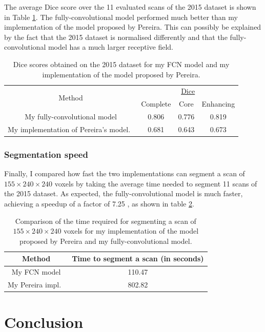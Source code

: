 \documentclass[12pt,a4paper,twoside,openright]{report}
\begin{document}
The average Dice score over the 11 evaluated scans of the 2015 dataset is shown in Table \ref{table:2015_dice}. The fully-convolutional model performed much better than my implementation of the model proposed by Pereira. This can possibly be explained by the fact that the 2015 dataset is normalised differently and that the fully-convolutional model has a much larger receptive field.
\begin{table}
\centering	
\begin{tabular}{c | c c c }
\multirow{2}{*}{Method} & \multicolumn{3}{c}{\underline{Dice}} \\
 & Complete & Core & Enhancing \\
 \hline
 My fully-convolutional model & 0.806 & 0.776 & 0.819\\
 My implementation of Pereira's model.\ & 0.681 & 0.643 & 0.673\\
\end{tabular}
\caption{Dice scores obtained on the 2015 dataset for my FCN model and my implementation of the model proposed by Pereira.}
\label{table:2015_dice}
\end{table}

\subsection{Segmentation speed}
Finally, I compared how fast the two implementations can segment a scan of $155 \times 240 \times 240$ voxels by taking the average time needed to segment 11 scans of the 2015 dataset. As expected, the fully-convolutional model is much faster, achieving a speedup of a factor of 7.25 , as shown in table \ref{table:time_comparison}.
\begin{table}[h]
\centering	
\begin{tabular}{c | c }
Method & Time to segment a scan (in seconds)\\
 \hline
 My FCN model & 110.47 \\
 My Pereira impl.\ & 802.82 \\
\end{tabular}
\caption{Comparison of the time required for segmenting a scan of $155 \times 240 \times 240$ voxels for my implementation of the model proposed by Pereira and my fully-convolutional model.}
\label{table:time_comparison}
\end{table}

\chapter{Conclusion}
\end{document}
